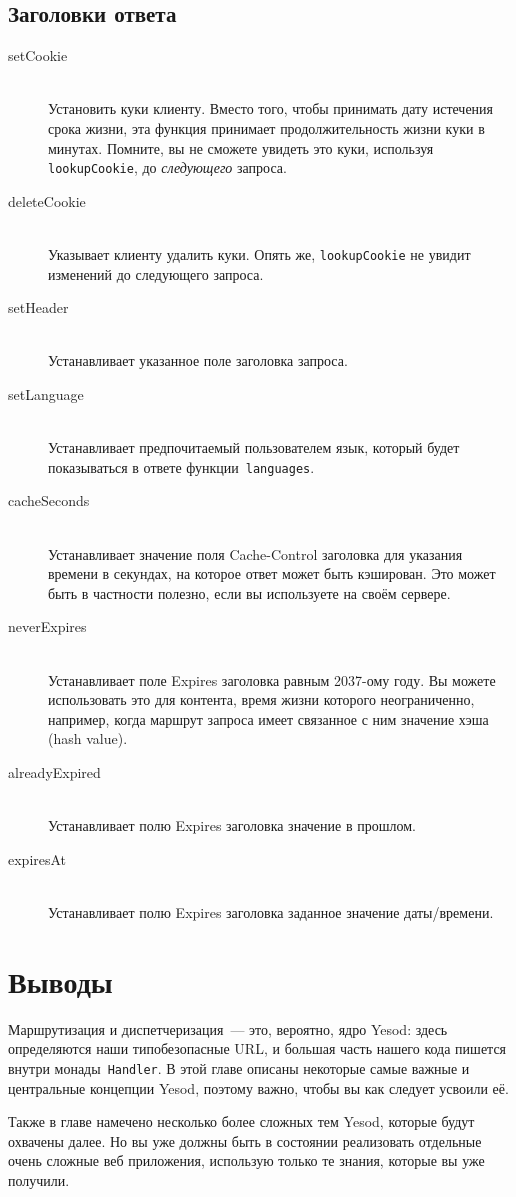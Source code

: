 \subsection{Заголовки ответа}
\begin{description}
\item[setCookie] \hfill \\
Установить куки клиенту. Вместо того, чтобы принимать дату истечения
срока жизни, эта функция принимает продолжительность жизни куки в
минутах. Помните, вы не сможете увидеть это куки, используя
\lstinline!lookupCookie!, до \emph{следующего} запроса.

\item[deleteCookie] \hfill \\
Указывает клиенту удалить куки. Опять же, \lstinline!lookupCookie! не
увидит изменений до следующего запроса.

\item[setHeader] \hfill \\
Устанавливает указанное поле заголовка запроса.

\item[setLanguage] \hfill \\
Устанавливает предпочитаемый пользователем язык, который будет
показываться в ответе функции~\lstinline!languages!.

\item[cacheSeconds] \hfill \\
Устанавливает значение поля Cache-Control заголовка для указания
времени в секундах, на которое ответ может быть кэширован. Это может
быть в частности полезно, если вы используете
 на своём сервере.

\item[neverExpires] \hfill \\
Устанавливает поле Expires заголовка равным 2037-ому году. Вы
можете использовать это для контента, время жизни которого
неограниченно, например, когда маршрут запроса имеет связанное с ним
значение хэша (hash value).

\item[alreadyExpired] \hfill \\
Устанавливает полю Expires заголовка значение в прошлом.

\item[expiresAt] \hfill \\
Устанавливает полю Expires заголовка заданное значение даты/времени.
\end{description}

\section{Выводы}
Маршрутизация и диспетчеризация~--- это, вероятно, ядро Yesod: здесь
определяются наши типобезопасные URL, и большая часть нашего кода
пишется внутри монады~\lstinline!Handler!. В этой главе описаны
некоторые самые важные и центральные концепции Yesod, поэтому важно,
чтобы вы как следует усвоили её.

Также в главе намечено несколько более сложных тем Yesod, которые
будут охвачены далее. Но вы уже должны быть в состоянии реализовать
отдельные очень сложные веб приложения, использую только те знания,
которые вы уже получили.
